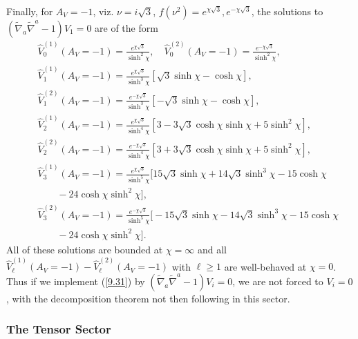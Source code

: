 Finally, for $A_V=-1$, viz. $\nu=i\surd{3}$, $f(\nu^2)=e^{\chi\surd{3}},e^{-\chi\surd{3}}$, the solutions to $(\tilde{\nabla}_a\tilde{\nabla}^a-1)V_1=0$ are of the form
%
\begin{eqnarray}
&&\hat{V}^{(1)}_0(A_V=-1)=\frac{e^{\chi\surd{3}}}{\sinh^2\chi},\quad \hat{V}^{(2)}_0(A_V=-1)=\frac{e^{-\chi\surd{3}}}{\sinh^2\chi},
\nonumber\\
&&\hat{V}^{(1)}_1(A_V=-1)=\frac{e^{\chi\surd{3}}}{\sinh^3\chi}\left[\surd{3}\sinh\chi-\cosh\chi\right],
\nonumber\\
&& \hat{V}^{(2)}_1(A_V=-1)=\frac{e^{-\chi\surd{3}}}{\sinh^3\chi}\left[-\surd{3}\sinh\chi-\cosh\chi\right],
\nonumber\\
&&\hat{V}^{(1)}_2(A_V=-1)=\frac{e^{\chi\surd{3}}}{\sinh^4\chi}\left[3-3\surd{3}\cosh\chi\sinh\chi+5\sinh^2\chi
\right],
\nonumber\\
&&\hat{V}^{(2)}_2(A_V=-1)=\frac{e^{-\chi\surd{3}}}{\sinh^4\chi}\left[3+3\surd{3}\cosh\chi\sinh\chi+5\sinh^2\chi\right],
\nonumber\\
&&\hat{V}^{(1)}_3(A_V=-1)=\frac{e^{\chi\surd{3}}}{\sinh^5\chi}\bigg[15\surd{3}\sinh\chi+14\surd{3}\sinh^3\chi
-15\cosh\chi
\nonumber\\
&&\qquad-24\cosh\chi\sinh^2\chi\bigg],
\nonumber\\
&&\hat{V}^{(2)}_3(A_V=-1)=\frac{e^{-\chi\surd{3}}}{\sinh^5\chi}\bigg[-15\surd{3}\sinh\chi-14\surd{3}\sinh^3\chi
-15\cosh\chi
\nonumber\\
&&\qquad-24\cosh\chi\sinh^2\chi\bigg].
\label{10.30b}
\end{eqnarray}
%
All of these solutions are bounded at $\chi=\infty$ and all $\hat{V}^{(1)}_{\ell}(A_V=-1)-\hat{V}^{(2)}_{\ell}(A_V=-1)$ with $\ell\geq 1$ are well-behaved at $\chi=0$.  Thus if we implement (\ref{9.31}) by $(\tilde{\nabla}_a\tilde{\nabla}^a-1)V_i=0$,  we are not forced to $V_i=0$, with the decomposition theorem not then following in this sector.



\subsubsection{The Tensor Sector}
\label{sss:tensor_sector}

